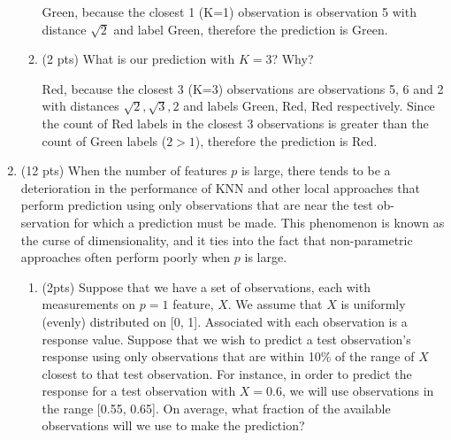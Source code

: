 \documentclass[a4paper]{article}
\theoremstyle{definition}
\newenvironment{soln}{
    \leavevmode\color{blue}\ignorespaces
}{}
\begin{document}
\begin{enumerate}
\begin{enumerate}
	\begin{soln}  Green, because the closest 1 (K=1) observation is observation 5 with distance $\sqrt{2}$ and label Green, therefore the prediction is Green. \end{soln}
	
	\item (2 pts) What is our prediction with $K=3$? Why?
	
	\begin{soln}  Red, because the closest 3 (K=3) observations are observations 5, 6 and 2 with distances $\sqrt{2}, \sqrt{3}, 2$ and labels Green, Red, Red respectively. Since the count of Red labels in the closest 3 observations is greater than the count of Green labels ($2 > 1$), therefore the prediction is Red. \end{soln}

\end{enumerate}

\item (12 pts) When the number of features $p$ is large, there tends to be a deterioration in the performance of KNN and other local approaches that perform prediction using only observations that are near the test ob- servation for which a prediction must be made. This phenomenon is known as the curse of dimensionality, and it ties into the fact that non-parametric approaches often perform poorly when $p$ is large.

\begin{enumerate}
	\item (2pts) Suppose that we have a set of observations, each with measurements on $p=1$ feature, $X$. We assume that $X$ is uniformly (evenly) distributed on [0, 1]. Associated with each observation is a response value. Suppose that we wish to predict a test observation’s response using only observations that are within 10\% of the range of $X$ closest to that test observation. For instance, in order to predict the response for a test observation with $X=0.6$, we will use observations in the range [0.55, 0.65]. On average, what fraction of the available observations will we use to make the prediction?
	

\end{enumerate}
\end{enumerate}
\end{document}
